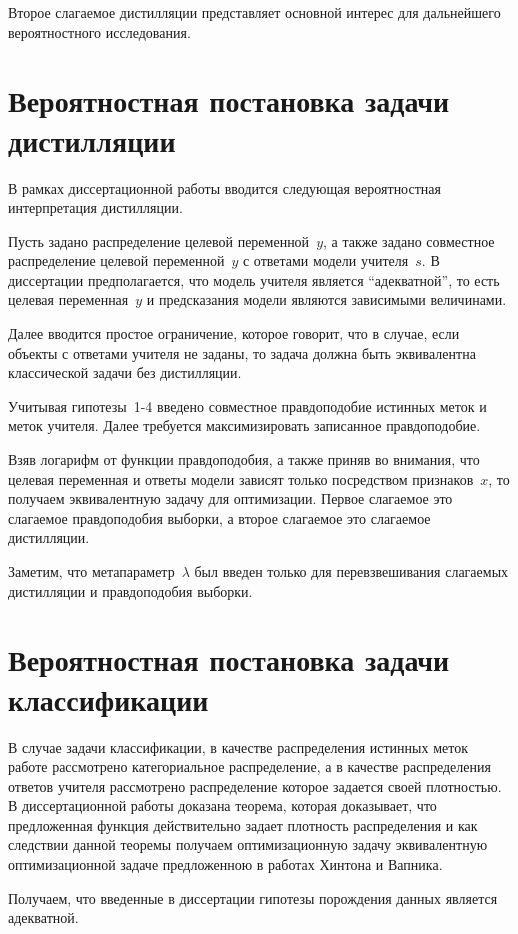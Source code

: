 \documentclass[10pt, twoside]{article}
\begin{document}
Второе слагаемое дистилляции представляет основной интерес для дальнейшего вероятностного исследования.

\section{Вероятностная постановка задачи дистилляции}
В рамках диссертационной работы вводится следующая вероятностная интерпретация дистилляции.

Пусть задано распределение целевой переменной~$y$, а также задано совместное распределение целевой переменной~$y$ с ответами модели учителя~$s$. В диссертации предполагается, что модель учителя является ``адекватной'', то есть целевая переменная~$y$ и предсказания модели являются зависимыми величинами. 

Далее вводится простое ограничение, которое говорит, что в случае, если объекты с ответами учителя не заданы, то задача должна быть эквивалентна классической задачи без дистилляции.

Учитывая гипотезы~1-4 введено совместное правдоподобие истинных меток и меток учителя. Далее требуется максимизировать записанное правдоподобие. 

Взяв логарифм от функции правдоподобия, а также приняв во внимания, что целевая переменная и ответы модели зависят только посредством признаков~$x$, то получаем эквивалентную задачу для оптимизации. Первое слагаемое это слагаемое правдоподобия выборки, а второе слагаемое это слагаемое дистилляции.

Заметим, что метапараметр~$\lambda$ был введен только для перевзвешивания слагаемых дистилляции и правдоподобия выборки.

\section{Вероятностная постановка задачи классификации}
В случае задачи классификации, в качестве распределения истинных меток  работе рассмотрено категориальное распределение, а в качестве распределения ответов учителя рассмотрено распределение которое задается своей плотностью.
В диссертационной работы доказана теорема, которая доказывает, что предложенная функция действительно задает плотность распределения и как следствии данной теоремы получаем оптимизационную задачу эквивалентную оптимизационной задаче предложенною в работах Хинтона и Вапника.

Получаем, что введенные в диссертации гипотезы порождения данных является адекватной.
\end{document}

